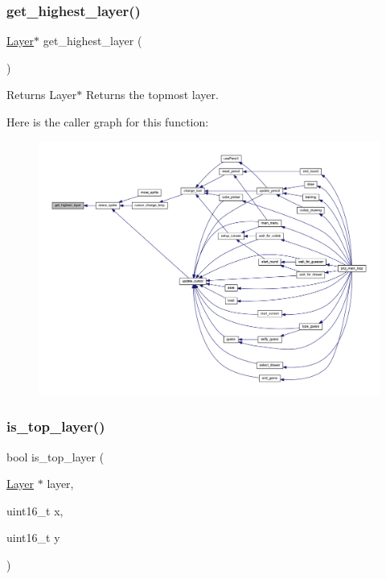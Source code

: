 \mbox{\label{group__layer_gaec705a8cfd8cc0d79ef36fa4f47da621}} 
\subsubsection{\texorpdfstring{get\+\_\+highest\+\_\+layer()}{get\_highest\_layer()}}
{\footnotesize\ttfamily \mbox{\hyperlink{struct_layer}{Layer}}$\ast$ get\+\_\+highest\+\_\+layer (\begin{DoxyParamCaption}{ }\end{DoxyParamCaption})}

\begin{DoxyReturn}{Returns}
Layer$\ast$ Returns the topmost layer. 
\end{DoxyReturn}
Here is the caller graph for this function\+:\nopagebreak
\begin{figure}[H]
\begin{center}
\leavevmode
\includegraphics[width=350pt]{group__layer_gaec705a8cfd8cc0d79ef36fa4f47da621_icgraph}
\end{center}
\end{figure}
\mbox{\label{group__layer_ga3eef68dc1d9d6086e747506f82a4eb11}} 
\subsubsection{\texorpdfstring{is\+\_\+top\+\_\+layer()}{is\_top\_layer()}}
{\footnotesize\ttfamily bool is\+\_\+top\+\_\+layer (\begin{DoxyParamCaption}\item[{\mbox{\hyperlink{struct_layer}{Layer}} $\ast$}]{layer,  }\item[{uint16\+\_\+t}]{x,  }\item[{uint16\+\_\+t}]{y }\end{DoxyParamCaption})}



